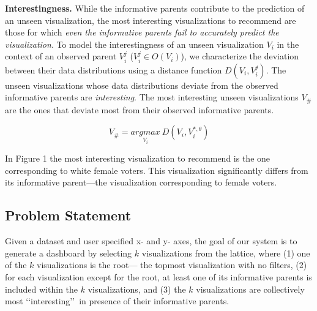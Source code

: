 \textbf{Interestingness.} While the informative parents contribute to the prediction of an unseen visualization, the most interesting visualizations to recommend are those for which \emph{even the informative parents fail to accurately predict the visualization}. To model the interestingness of an unseen visualization $V_i$ in the context of an observed parent $V_i^j$ ($V_i^j \in O(V_i)$), we characterize the deviation between their data distributions using a distance function $D(V_i, V_i^j)$. The unseen visualizations whose data distributions deviate from the observed informative parents are \emph{interesting}. The most interesting unseen visualizations $V_\#$ are the ones that deviate most from their observed informative parents. 


\begin{equation}
    V_\#=\underset{V_i}{argmax} \ D(V_i, V_i^{*, \theta})
\end{equation}

In Figure 1 the most interesting visualization to recommend is the one corresponding to white female voters. This visualization significantly differs from its informative parent---the visualization corresponding to female voters.


\subsection{Problem Statement}

Given a dataset and user specified x- and y- axes, the goal of our system is to generate a dashboard by selecting $k$ visualizations from the lattice, where (1) one of the $k$ visualizations is the root--- the topmost visualization with no filters, (2) for each visualization except for the root, at least one of its informative parents is included within the $k$ visualizations, and (3) the $k$ visualizations are collectively most \lq\lq interesting\rq\rq\ in presence of their informative parents.

